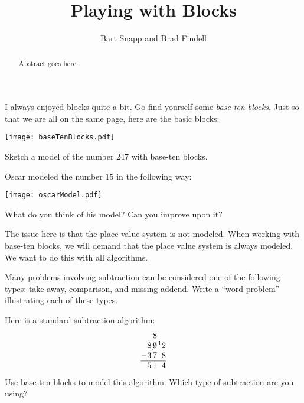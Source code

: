 \documentclass{ximera}
\title{Playing with Blocks}
\author{Bart Snapp and Brad Findell}
\begin{document}
\begin{abstract}
Abstract goes here.  
\end{abstract}
\maketitle

\label{A:B1}

I always enjoyed blocks quite a bit. Go find yourself
some \textit{base-ten blocks}. Just so that we are all on the same
page, here are the basic blocks:
\begin{image}
\texttt{[image: baseTenBlocks.pdf]}
\end{image}

\begin{problem} 
Sketch a model of the number $247$ with base-ten blocks.
\vspace{0.8in}
\end{problem}

\begin{problem}
Oscar modeled the number $15$ in the following way:
\begin{image}
\texttt{[image: oscarModel.pdf]}
\end{image}
What do you think of his model?  Can you improve upon it?  
\vspace{0.5in}
\end{problem}

\begin{teachingnote}
The issue here is that the place-value system is not modeled. When
working with base-ten blocks, we will demand that the place value
system is always modeled.  We want to do this with all algorithms.
\end{teachingnote}

\begin{problem}
Many problems involving subtraction can be considered one of the
following types: take-away, comparison, and missing addend.  Write a
``word problem'' illustrating each of these types.
\end{problem}

\begin{problem} 
Here is a standard subtraction algorithm:
\[
\normalfont
\begin{tabular}{@{}r@{}r@{}r@{}r@{}}
&   & 8 &  \\
& 8 & $\not{\hspace{-.2ex}9}$ & $\hspace{.3ex}\leftexp{1}2$\\
$-$ & 3 & 7 & 8\\ \hline
& 5 & 1 & 4
\end{tabular}
\]
Use base-ten blocks to model this algorithm.  Which type of subtraction are you using?  
\end{problem}
\end{document}
